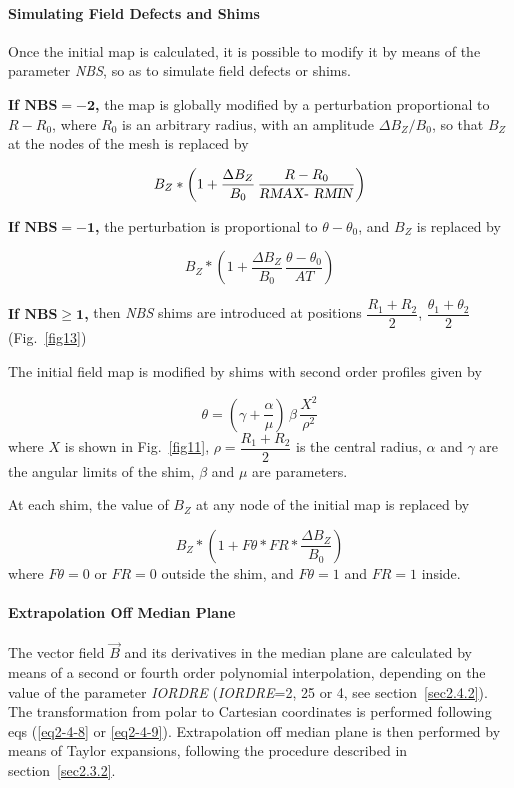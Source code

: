 {\paragraph{Simulating Field Defects and Shims }

\noindent Once the initial map is calculated, it is possible to modify it by
means of the parameter \textsl{NBS}, so as to simulate field defects or shims. 
\bigskip

\noindent\textbf{If $\mathbf{NBS = - 2}$,} the map is globally modified by a
perturbation proportional to $ R-R_0 $, 
where $ R_0 $ is an arbitrary radius, with an amplitude $ \Delta B_Z/B_0 $, so
that $ B_Z $ at the nodes of the mesh is replaced by 

$$ B_Z  \ast   \left(1+ \dfrac{\Delta B_Z }{ B_0}\, \dfrac{R-R_0 }{\text{\textsl{RMAX}- \textsl{RMIN}}} \right) $$

\noindent\textbf{If  $\mathbf{NBS =  - 1}$,} the perturbation is proportional to
$ \theta -\theta_ 0 $, and $ B_Z $ is replaced by 

$$ B_Z \ast  \left(1+ \dfrac{\Delta B_Z }{ B_0} \, \dfrac{\theta -\theta_ 0 }{ AT}\right) $$

\noindent\textbf{If  $\mathbf{NBS \geq 1}$,} then \textsl{NBS} shims are introduced at
positions $ \dfrac{ R_1+R_2 }{ 2}$, $\dfrac{\theta_ 1+\theta_ 2 }{ 2} $ 
(Fig.~\ref{fig13})~\cite{Biblio13}   %

\noindent The initial field map is modified by shims with second order profiles given by 

$$ \theta  = \left(\gamma  + \dfrac{\alpha }{ \mu} \right) \,\beta\, \dfrac{X^2 }{\rho^ 2} $$
%
 where $ X $ is shown in  Fig.~\ref{fig11}, 
 $\rho = \dfrac{R_1+R_2 }{ 2} $ is the central radius, $\alpha$ and $\gamma$ are the angular 
 limits of the shim, $\beta$ and $\mu$ are parameters. 
 
\noindent At each shim, the value of $ B_Z $ at any node of the initial map is replaced by 

$$ B_Z \ast  \left(1+F\theta  \ast  FR \ast  \dfrac{\Delta B_Z }{ B_0} \right)
$$
%
 where $ F\theta =0 $ or $ FR=0 $ outside the shim, and $ F\theta =1$ and $ FR=1 $ inside.  
\bigskip

\paragraph{Extrapolation Off Median Plane} 

\noindent The vector field $ \vec  B $ and its derivatives in the median plane
are calculated by means of a second or fourth order polynomial 
interpolation, depending 
on the value of the parameter \textsl{IORDRE} (\textsl{IORDRE}=2, 25 or 4, see 
section~\ref{sec2.4.2}). 
The transformation from polar to Cartesian coordinates is 
performed following eqs (\ref{eq2-4-8} or \ref{eq2-4-9}). Extrapolation off median plane is then 
performed by means of Taylor expansions, following the procedure described 
in section~\ref{sec2.3.2}. 









}

